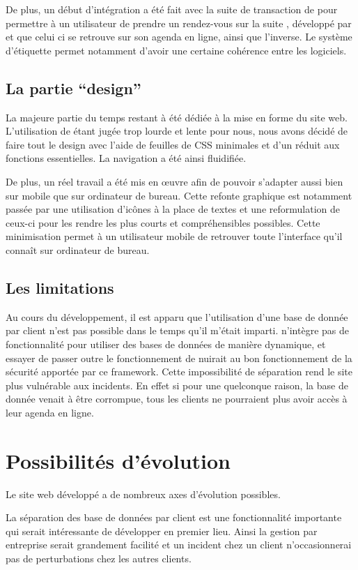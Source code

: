 \documentclass[a4paper, 11pt]{report}
\begin{document}
    De plus, un début d'intégration a été fait avec la suite de transaction de \logilink pour permettre à un utilisateur de prendre un rendez-vous sur la suite \ulti, développé par \logilink et que celui ci se retrouve sur son agenda en ligne, ainsi que l'inverse. Le système d'étiquette permet notamment d'avoir une certaine cohérence entre les logiciels.

    \subsection{La partie ``design''}
    La majeure partie du temps restant à été dédiée à la mise en forme du site web. L'utilisation de \bootstrap étant jugée trop lourde et lente pour nous, nous avons décidé de faire tout le design avec l'aide de feuilles de CSS minimales et d'un \javascript réduit aux fonctions essentielles. La navigation a été ainsi fluidifiée.

    De plus, un réel travail a été mis en œuvre afin de pouvoir s'adapter aussi bien sur mobile que sur ordinateur de bureau. Cette refonte graphique est notamment passée par une utilisation d’icônes à la place de textes et une reformulation de ceux-ci pour les rendre les plus courts et compréhensibles possibles. Cette minimisation permet à un utilisateur mobile de retrouver toute l'interface qu'il connaît sur ordinateur de bureau.

    \subsection{Les limitations}
    Au cours du développement, il est apparu que l'utilisation d'une base de donnée par client n'est pas possible dans le temps qu'il m'était imparti. \symfony n'intègre pas de fonctionnalité pour utiliser des bases de données de manière dynamique, et essayer de passer outre le fonctionnement de \symfony nuirait au bon fonctionnement de la sécurité apportée par ce framework. Cette impossibilité de séparation rend le site plus vulnérable aux incidents. En effet si pour une quelconque raison, la base de donnée venait à être corrompue, tous les clients ne pourraient plus avoir accès à leur agenda en ligne.

\section{Possibilités d'évolution}
    Le site web développé a de nombreux axes d'évolution possibles.

    La séparation des base de données par client est une fonctionnalité importante qui serait intéressante de développer en premier lieu. Ainsi la gestion par entreprise serait grandement facilité et un incident chez un client n’occasionnerai pas de perturbations chez les autres clients.
\end{document}
